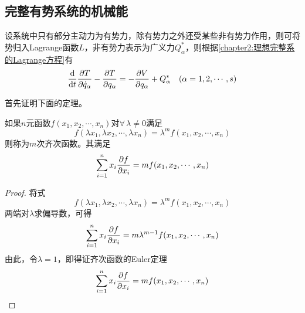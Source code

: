 \subsection{完整有势系统的机械能}

设系统中只有部分主动力为有势力，除有势力之外还受某些非有势力作用，则可将势归入Lagrange函数$L$，非有势力表示为广义力$Q_\alpha^*$，则根据\eqref{chapter2:理想完整系的Lagrange方程}有
\begin{equation}
	\frac{\mathrm{d}}{\mathrm{d} t} \frac{\partial T}{\partial \dot{q}_\alpha} - \frac{\partial T}{\partial q_\alpha} = -\frac{\partial V}{\partial q_\alpha} + Q_\alpha^* \quad (\alpha =1,2,\cdots,s)
	\label{chapter2:部分主动力为有势力的完整系统的Lagrange方程}
\end{equation}

首先证明下面的定理。
\begin{theorem}[齐次函数的Euler定理]
\label{齐次函数的Euler定理}
如果$n$元函数$f(x_1,x_2,\cdots,x_n)$对$\forall \, \lambda \neq 0$满足
\begin{equation*}
	f(\lambda x_1,\lambda x_2,\cdots,\lambda x_n) = \lambda^m f(x_1,x_2,\cdots,x_n)
\end{equation*}
则称为$m$次{\heiti 齐次函数}。其满足
\begin{equation}
	\sum_{i=1}^n x_i \frac{\partial f}{\partial x_i} = mf(x_1,x_2,\cdots,x_n)
\end{equation}
\end{theorem}
\begin{proof}
将式
\begin{equation*}
	f(\lambda x_1,\lambda x_2,\cdots,\lambda x_n) = \lambda^m f(x_1,x_2,\cdots,x_n)
\end{equation*}
两端对$\lambda$求偏导数，可得
\begin{equation*}
	\sum_{i=1}^n x_i \frac{\partial f}{\partial x_i} = m\lambda^{m-1} f(x_1,x_2,\cdots,x_n)
\end{equation*}
由此，令$\lambda = 1$，即得证齐次函数的Euler定理
\begin{equation*}
	\sum_{i=1}^n x_i \frac{\partial f}{\partial x_i} = mf(x_1,x_2,\cdots,x_n) \qedhere
\end{equation*}
\end{proof}

